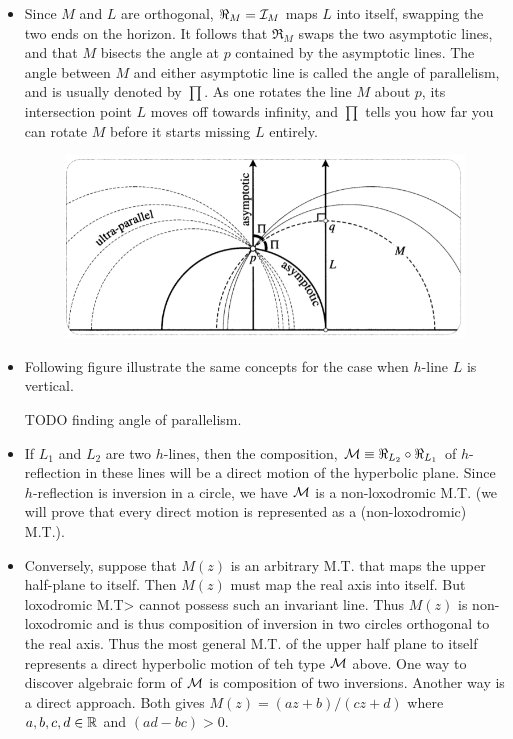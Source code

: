 \documentclass[12pt]{article}
\def\mc{\ensuremath\mathcal}
\def\mb{\ensuremath\mathbb}
\def\R{\ensuremath\mb{R}}
\begin{document}
\begin{itemize}
    \item Since $M$ and $L$ are orthogonal, $\Re_{M} = \mc{I}_M$ maps $L$ into itself, swapping the two ends on the horizon. It follows that $\Re_{M}$ swaps the two asymptotic lines, and that $M$ bisects the angle at $p$ contained by the asymptotic lines. The angle between $M$ and either asymptotic line is called the angle of parallelism, and is usually denoted by $\prod$. As one rotates the line $M$ about $p$, its intersection point $L$ moves off towards infinity, and $\prod$ tells you how far you can rotate $M$ before it starts missing $L$ entirely.

    \begin{figure}[h!]
        \centering
        \includegraphics[scale=0.7]{fig_20}
        \label{fig_20}
    \end{figure}

    \item Following figure illustrate the same concepts for the case when $h$-line $L$ is vertical.

    \item [TODO] finding angle of parallelism.

    \item If $L_1$ and $L_2$ are two $h$-lines, then the composition, $\mc{M}\equiv \Re_{L_2} \circ \Re_{L_1}$ of $h$-reflection in these lines will be a direct motion of the hyperbolic plane. Since $h$-reflection is inversion in a circle, we have $\mc{M}$ is a non-loxodromic M.T. (we will prove that every direct motion is represented as a (non-loxodromic) M.T.).

    \item Conversely, suppose that $M(z)$ is an arbitrary M.T. that maps the upper half-plane to itself. Then $M(z)$ must map the real axis into itself. But loxodromic M.T> cannot possess such an invariant line. Thus $M(z)$ is non-loxodromic and is thus composition of inversion in two circles orthogonal to the real axis. Thus the most general M.T. of the upper half plane to itself represents a direct hyperbolic motion of teh type $\mc{M}$ above. One way to discover algebraic form of $\mc{M}$ is composition of two inversions. Another way is a direct approach. Both gives $M(z) = (az+b)/(cz+d)$ where $a,b,c,d\in\R$ and $(ad-bc) > 0$.


\end{itemize}
\end{document}
